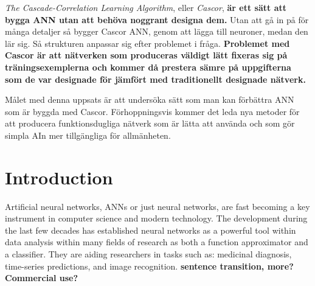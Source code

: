 \documentclass[a4paper,11pt, usenatbib]{article}
\begin{document}
\textit{The Cascade-Correlation Learning Algorithm}, eller \textit{Cascor}, \textbf{är ett sätt att bygga ANN utan att behöva noggrant designa dem.} Utan att gå in på för många detaljer så bygger Cascor ANN, genom att lägga till neuroner, medan den lär sig. Så strukturen anpassar sig efter problemet i fråga. \textbf{Problemet med Cascor är att nätverken som produceras väldigt lätt fixeras sig på träningsexemplerna och kommer då prestera sämre på uppgifterna som de var designade för jämfört med traditionellt designade nätverk.}


Målet med denna uppsats är att undersöka sätt som man kan förbättra ANN som är byggda med Cascor. Förhoppningsvis kommer det leda nya metoder för att producera funktionsdugliga nätverk som är lätta att använda och som gör simpla AIn mer tillgängliga för allmänheten.

\vfill

\newpage

\tableofcontents
\listoffigures 
\listoftables


\newpage
\section{Introduction}
\setcounter{equation}{0}
\label{sec:introduction}



Artificial neural networks, ANNs or just neural networks, are fast becoming a key instrument in computer science and modern technology. The development during the last few decades has established neural networks as a powerful tool within data analysis within many fields of research as both a function approximator\cite{hornik_multilayer_1989} and a classifier\cite{zhang_neural_2000}. They are aiding researchers in tasks such as: medicinal diagnosis\cite{amato_artificial_2013}, time-series predictions\cite{zhang_investigation_2001}, and image recognition\cite{simonyan_very_2014}. \textbf{sentence transition, more? Commercial use?} 

\end{document}
